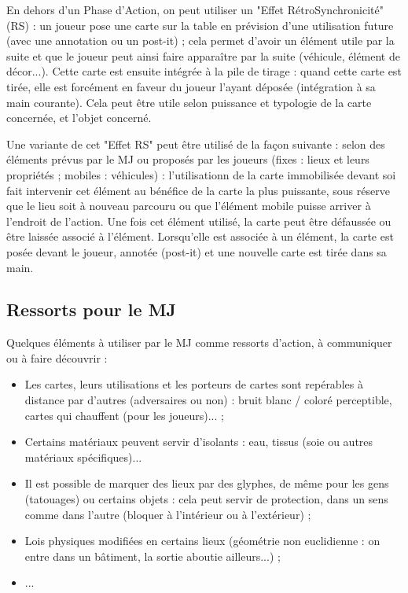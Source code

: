 \documentclass[11pt,twoside,a5paper]{book}
\begin{document}
En dehors d'un Phase d'Action, on peut utiliser un "Effet R{\'e}troSynchronicit{\'e}" (RS) : un joueur pose une carte sur la table en pr{\'e}vision d'une utilisation future (avec une annotation ou un post-it) ; cela permet d'avoir un {\'e}l{\'e}ment utile par la suite et que le joueur peut ainsi faire appara{\^i}tre par la suite (v{\'e}hicule, {\'e}l{\'e}ment de d{\'e}cor...). Cette carte est ensuite int{\'e}gr{\'e}e {\`a} la pile de tirage : quand cette carte est tir{\'e}e, elle est forc{\'e}ment en faveur du joueur l'ayant d{\'e}pos{\'e}e (int{\'e}gration {\`a} sa main courante). Cela peut {\^e}tre utile selon puissance et typologie de la carte concern{\'e}e, et l'objet concern{\'e}.~\\

\clearpage

Une variante de cet "Effet RS" peut {\^e}tre utilis{\'e} de la fa\c{c}on suivante : selon des {\'e}l{\'e}ments pr{\'e}vus par le MJ ou propos{\'e}s par les joueurs (fixes : lieux et leurs propri{\'e}t{\'e}s ; mobiles : v{\'e}hicules) : l'utilisationn de la carte immobilis{\'e}e devant soi fait intervenir cet {\'e}l{\'e}ment au b{\'e}n{\'e}fice de la carte la plus puissante, sous r{\'e}serve que le lieu soit {\`a} nouveau parcouru ou que l'{\'e}l{\'e}ment mobile puisse arriver {\`a} l'endroit de l'action. Une fois cet {\'e}l{\'e}ment utilis{\'e}, la carte peut {\^e}tre d{\'e}fauss{\'e}e ou {\^e}tre laiss{\'e}e associ{\'e} {\`a} l'{\'e}l{\'e}ment. Lorsqu'elle est associ{\'e}e {\`a} un {\'e}l{\'e}ment, la carte est pos{\'e}e devant le joueur, annot{\'e}e (post-it) et une nouvelle carte est tir{\'e}e dans sa main. %

\subsection{Ressorts pour le MJ}

Quelques {\'e}l{\'e}ments {\`a} utiliser par le MJ comme ressorts d'action, {\`a} communiquer ou {\`a} faire d{\'e}couvrir : 
\begin{itemize}
	\item Les cartes, leurs utilisations et les porteurs de cartes sont rep{\'e}rables {\`a} distance par d'autres (adversaires ou non) : bruit blanc / color{\'e} perceptible, cartes qui chauffent (pour les joueurs)... ; 
	\item Certains mat{\'e}riaux peuvent servir d'isolants : eau, tissus (soie ou autres mat{\'e}riaux sp{\'e}cifiques)...
	\item Il est possible de marquer des lieux par des glyphes, de m{\^e}me pour les gens (tatouages) ou certains objets : cela peut servir de protection, dans un sens comme dans l'autre (bloquer {\`a} l'int{\'e}rieur ou {\`a} l'ext{\'e}rieur) ; 
	\item Lois physiques modifi{\'e}es en certains lieux (g{\'e}om{\'e}trie non euclidienne : on entre dans un b{\^a}timent, la sortie aboutie ailleurs...) ; 
	\item ... 
\end{itemize}%
\end{document}
